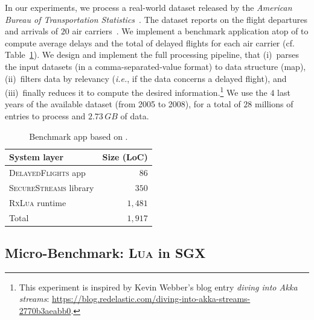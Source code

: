 In our experiments, we process a real-world dataset released by the \emph{American Bureau of Transportation Statistics}~\cite{rita:bts}.
The dataset reports on the flight departures and arrivals of $20$ air carriers~\cite{statistical_computing:data}.
We implement a benchmark application atop of \SYS{} to compute average delays and the total of delayed flights for each air carrier (cf. Table~\ref{tab:appsize}).
We design and implement the full processing pipeline, that (i)~parses the input datasets (in a comma-separated-value format) to data structure (\textsf{map}), (ii)~filters data by relevancy (\emph{i.e.}, if the data concerns a delayed flight), and (iii)~finally reduces it to compute the desired information.\footnote{This experiment is inspired by Kevin Webber's blog entry \emph{diving into Akka streams}: \url{https://blog.redelastic.com/diving-into-akka-streams-2770b3aeabb0}.}
We use the $4$ last years of the available dataset (from 2005 to 2008), for a total of $28$ millions of entries to process and $2.73\,GB$ of data.


\begin{table}[t!]
    \centering
    \begin{tabular}{l|r}
\textbf{System layer}          & \textbf{Size (LoC)} \\
\hline
\textsc{DelayedFlights} app    & $86$ \\
\textsc{SecureStreams} library & $350$ \\
\textsc{RxLua} runtime         & $1,481$ \\
\hline
\hline
Total                          & $1,917$ \\
    \end{tabular}
    \caption{Benchmark app based on \SYS{}.}
  \label{tab:appsize}
\end{table}

\subsection{Micro-Benchmark: \textsc{Lua} in SGX}


